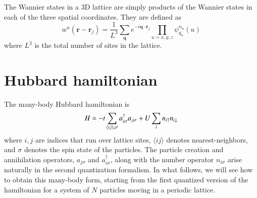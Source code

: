 \documentclass[oneside,11pt]{memoir}
\newcommand{\bv}[1]{\ensuremath{\bm{#1}}}
\newcommand{\spup}{\ensuremath{ \uparrow }}
\newcommand{\spdn}{\ensuremath{ \downarrow}}
\begin{document}
The Wannier states in a 3D lattice are simply products of the Wannier states in
each of the three spatial coordinates.  They are defined as 
\begin{equation}
 w^{n}(\bv{r}-\bv{r}_{j}) =  \frac{1}{L^{3}} \sum_{\bv{q}} e^{-i \bv{q}\cdot\bv{r}_{j} }
     \prod_{u=x,y,z}  \psi_{q_{u}}^{n_{u}}(u) 
 \label{eq:wannier3D}
\end{equation}
where $L^{3}$ is the total number of sites in the lattice. 

\section{Hubbard hamiltonian}

The many-body Hubbard hamiltonian is 
\begin{equation}
  H =  
-t \sum_{ \langle ij \rangle, \sigma   } 
          a_{i\sigma}^{\dagger}a_{j\sigma} \\
         + U\sum_{i} n_{i\spup} n_{i\spdn}  
\end{equation}
where $i,j$ are indices that run over lattice sites, $\langle ij \rangle$
denotes nearest-neighbors, and $\sigma$ denotes the spin state of the
particles.  The particle creation and annihilation operators,  $a_{j\sigma}$
and $a_{i\sigma}^{\dagger}$,  along with the number operator $n_{i\sigma}$
arise naturally in the second quantization formalism. In what follows, we will
see how to obtain this many-body form, starting from the first quantized
version of the hamiltonian for a system of $N$ particles moving in a periodic
lattice. 
\end{document}
